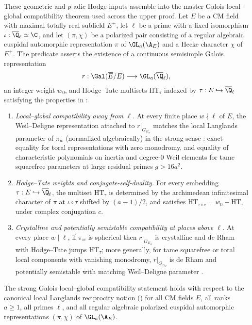 These geometric and $p$-adic Hodge inputs assemble into the master Galois
local--global compatibility theorem used across the upper proof. Let $E$ be a
CM field with maximal totally real subfield $E^+$, let $\ell$ be a prime with
a fixed isomorphism $\iota : \overline{\Q}_\ell \simeq \C$, and let
$(\pi, \chi)$ be a polarized pair
 consisting of a regular
algebraic cuspidal automorphic representation $\pi$ of $\GL_a(\A_E)$ and a
Hecke character $\chi$ of $E^+$. The predicate
 asserts the existence of a continuous
semisimple Galois representation
\[
  r : \Gal(\overline{E}/E) \longrightarrow \GL_a(\overline{\Q}_\ell),
\]
an integer weight $w_0$, and Hodge--Tate multisets $\mathrm{HT}_\tau$ indexed
by $\tau : E \hookrightarrow \overline{\Q}_\ell$ satisfying the properties in
:
\begin{enumerate}
  \item \emph{Local--global compatibility away from $\ell$.} At every finite
  place $w \nmid \ell$ of $E$, the Weil--Deligne representation attached to
  $r|_{G_{E_w}}$ matches the local Langlands parameter
   of $\pi_w$ (normalized algebraically)
  in the strong sense : exact equality for
  toral representations with zero monodromy, and equality of characteristic
  polynomials on inertia and degree-$0$ Weil elements for tame squarefree
  parameters at large residual primes $g > 16 a^2$.
  \item \emph{Hodge--Tate weights and conjugate-self-duality.} For every
  embedding $\tau : E \hookrightarrow \overline{\Q}_\ell$, the multiset
  $\mathrm{HT}_\tau$ is determined by the archimedean infinitesimal character
  of $\pi$ at $\iota \circ \tau$ shifted by $(a-1)/2$, and satisfies
  $\mathrm{HT}_{\tau \circ c} = w_0 - \mathrm{HT}_\tau$ under complex
  conjugation $c$.
  \item \emph{Crystalline and potentially semistable compatibility at places
  above $\ell$.} At every place $w \mid \ell$, if $\pi_w$ is spherical then
  $r|_{G_{E_w}}$ is crystalline and de Rham with Hodge--Tate jumps
  $\mathrm{HT}_\tau$; more generally, for tame squarefree or toral local
  components with vanishing monodromy, $r|_{G_{E_w}}$ is de Rham and
  potentially semistable with matching Weil--Deligne parameter
  .
\end{enumerate}

\begin{theorem}
\label{thm:galois-local-global}
The strong Galois local--global compatibility statement
 holds with respect to the canonical local
Langlands reciprocity notion 
() for all CM fields $E$, all ranks
$a \ge 1$, all primes $\ell$, and all regular algebraic polarized cuspidal
automorphic representations $(\pi, \chi)$ of $\GL_a(\A_E)$.
\end{theorem}


